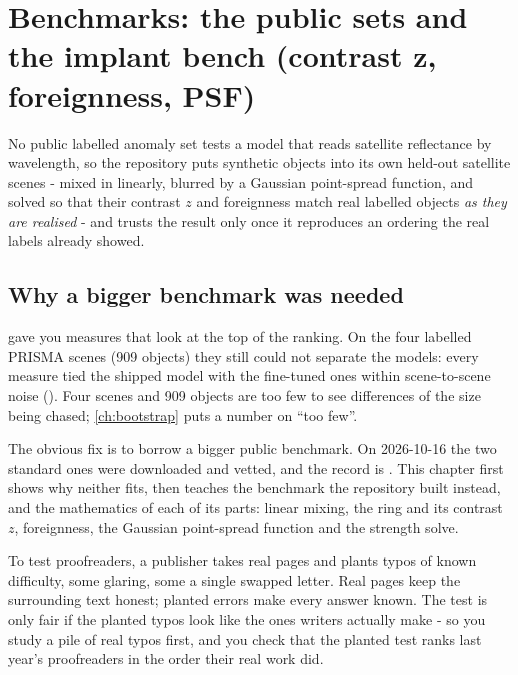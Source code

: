 \chapter{Benchmarks: the public sets and the implant bench (contrast z, foreignness, PSF)}\label{ch:benchmarks}

\begin{onething}
No public labelled anomaly set tests a model that reads satellite reflectance by wavelength, so the repository puts
synthetic objects into its own held-out satellite scenes - mixed in linearly, blurred by a Gaussian point-spread
function, and solved so that their contrast $z$ and foreignness match real labelled objects \emph{as they are
realised} - and trusts the result only once it reproduces an ordering the real labels already showed.
\end{onething}

\section{Why a bigger benchmark was needed}\label{sec:benchmarks:why}

 gave you measures that look at the top of the ranking. On the four labelled PRISMA scenes
(909 objects\hfil{}\hfilneg{}) they still could not separate the models: every
measure tied the shipped model with the fine-tuned ones within scene-to-scene noise
(). Four scenes and 909 objects are too few to
see differences of the size being chased; \cref{ch:bootstrap} puts a number on ``too few''.

The obvious fix is to borrow a bigger public benchmark. On 2026-10-16 the two standard ones were downloaded and
vetted, and the record is . This chapter first shows why neither
fits, then teaches the benchmark the repository built instead, and the mathematics of each of its parts:
linear mixing, the ring and its contrast $z$, foreignness, the Gaussian point-spread function and the strength solve.

\begin{analogy}
To test proofreaders, a publisher takes real pages and plants typos of known difficulty, some glaring, some a single
swapped letter. Real pages keep the surrounding text honest; planted errors make every answer known. The test is only
fair if the planted typos look like the ones writers actually make - so you study a pile of real typos first, and
you check that the planted test ranks last year's proofreaders in the order their real work did.
\end{analogy}

